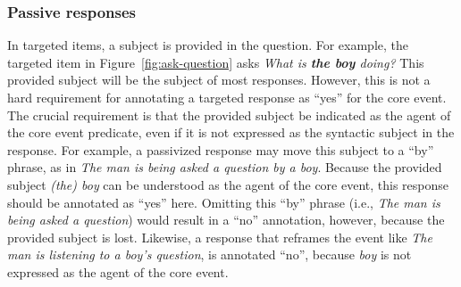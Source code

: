 \documentclass[12pt,notitlepage]{article}
\begin{document}
\subsubsection{Passive responses} In targeted items, a subject is provided in the question. For example, the targeted item in Figure~\ref{fig:ask-question} asks \textit{What is \textbf{the boy} doing?} This provided subject will be the subject of most responses. However, this is not a hard requirement for annotating a targeted response as ``yes'' for the core event. The crucial requirement is that the provided subject be indicated as the agent of the core event predicate, even if it is not expressed as the syntactic subject in the response. For example, a passivized response may move this subject to a ``by'' phrase, as in \textit{The man is being asked a question by a boy}. Because the provided subject \textit{(the) boy} can be understood as the agent of the core event, this response should be annotated as ``yes'' here. Omitting this ``by'' phrase (i.e., \textit{The man is being asked a question}) would result in a ``no'' annotation, however, because the provided subject is lost. Likewise, a response that reframes the event like \textit{The man is listening to a boy's question}, is annotated ``no'', because \textit{boy} is not expressed as the agent of the core event.
\end{document}
